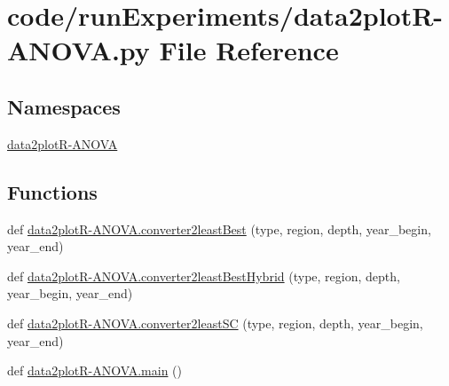 \hypertarget{data2plot_r-_a_n_o_v_a_8py}{}\section{code/run\+Experiments/data2plot\+R-\/\+A\+N\+O\+VA.py File Reference}
\label{data2plot_r-_a_n_o_v_a_8py}
\subsection*{Namespaces}
\begin{DoxyCompactItemize}
\item 
 \hyperlink{namespacedata2plot_r-_a_n_o_v_a}{data2plot\+R-\/\+A\+N\+O\+VA}
\end{DoxyCompactItemize}
\subsection*{Functions}
\begin{DoxyCompactItemize}
\item 
def \hyperlink{namespacedata2plot_r-_a_n_o_v_a_a76036bef0ed96408db0b5384fb68c280}{data2plot\+R-\/\+A\+N\+O\+V\+A.\+converter2least\+Best} (type, region, depth, year\+\_\+begin, year\+\_\+end)
\item 
def \hyperlink{namespacedata2plot_r-_a_n_o_v_a_a52bf879d3542185ef4d184db239b9085}{data2plot\+R-\/\+A\+N\+O\+V\+A.\+converter2least\+Best\+Hybrid} (type, region, depth, year\+\_\+begin, year\+\_\+end)
\item 
def \hyperlink{namespacedata2plot_r-_a_n_o_v_a_ab61a4a03e766a1cebbe27e57446b042e}{data2plot\+R-\/\+A\+N\+O\+V\+A.\+converter2least\+SC} (type, region, depth, year\+\_\+begin, year\+\_\+end)
\item 
def \hyperlink{namespacedata2plot_r-_a_n_o_v_a_ab3d02ce013a6854a4157d2b785dd4039}{data2plot\+R-\/\+A\+N\+O\+V\+A.\+main} ()
\end{DoxyCompactItemize}
